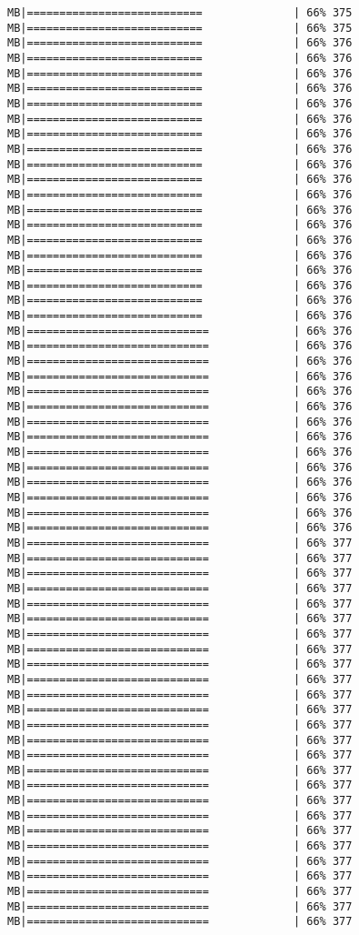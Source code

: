 \documentclass[
]{article}
\begin{document}
\begin{verbatim}
MB|===========================              | 66% 375 MB|===========================              | 66% 375 MB|===========================              | 66% 376 MB|===========================              | 66% 376 MB|===========================              | 66% 376 MB|===========================              | 66% 376 MB|===========================              | 66% 376 MB|===========================              | 66% 376 MB|===========================              | 66% 376 MB|===========================              | 66% 376 MB|===========================              | 66% 376 MB|===========================              | 66% 376 MB|===========================              | 66% 376 MB|===========================              | 66% 376 MB|===========================              | 66% 376 MB|===========================              | 66% 376 MB|===========================              | 66% 376 MB|===========================              | 66% 376 MB|===========================              | 66% 376 MB|===========================              | 66% 376 MB|===========================              | 66% 376 MB|============================             | 66% 376 MB|============================             | 66% 376 MB|============================             | 66% 376 MB|============================             | 66% 376 MB|============================             | 66% 376 MB|============================             | 66% 376 MB|============================             | 66% 376 MB|============================             | 66% 376 MB|============================             | 66% 376 MB|============================             | 66% 376 MB|============================             | 66% 376 MB|============================             | 66% 376 MB|============================             | 66% 376 MB|============================             | 66% 376 MB|============================             | 66% 377 MB|============================             | 66% 377 MB|============================             | 66% 377 MB|============================             | 66% 377 MB|============================             | 66% 377 MB|============================             | 66% 377 MB|============================             | 66% 377 MB|============================             | 66% 377 MB|============================             | 66% 377 MB|============================             | 66% 377 MB|============================             | 66% 377 MB|============================             | 66% 377 MB|============================             | 66% 377 MB|============================             | 66% 377 MB|============================             | 66% 377 MB|============================             | 66% 377 MB|============================             | 66% 377 MB|============================             | 66% 377 MB|============================             | 66% 377 MB|============================             | 66% 377 MB|============================             | 66% 377 MB|============================             | 66% 377 MB|============================             | 66% 377 MB|============================             | 66% 377 MB|============================             | 66% 377 MB|============================             | 66% 377 
\end{verbatim}
\end{document}
